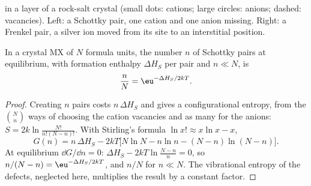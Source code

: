\begin{omfigure}

{\small {} in a layer of a rock-salt crystal (small dots: cations;
large circles: anions; dashed: vacancies). Left: a Schottky pair, one cation
and one anion missing. Right: a Frenkel pair, a silver ion moved from its site
to an interstitial position.}
\end{omfigure}

\begin{theorem}\label{thm:b3:solid-state:schottky}
In a crystal MX of $N$ formula units, the number $n$ of Schottky pairs at
equilibrium, with formation enthalpy $\Delta H_S$ per pair and $n \ll N$, is
\[
  \frac{n}{N} = \eu^{-\Delta H_S/2kT}.
\]
\end{theorem}

\begin{proof}
Creating $n$ pairs costs $n\,\Delta H_S$ and gives a configurational entropy, from the
$\binom{N}{n}$ ways of choosing the cation vacancies and as many for the anions:
$S = 2k\ln\frac{N!}{n!(N - n)!}$. With Stirling's formula $\ln x! \approx x\ln x - x$,
\[
  G(n) = n\,\Delta H_S - 2kT\bigl[N\ln N - n\ln n - (N - n)\ln(N - n)\bigr].
\]
At equilibrium $\dd G/\dd n = 0$: $\Delta H_S - 2kT\ln\frac{N - n}{n} = 0$, so $n/(N - n) = \eu^{-\Delta H_S/2kT}$, and $n/N$ for
$n \ll N$. The vibrational entropy of the defects, neglected here, multiplies the
result by a constant factor.
\end{proof}

